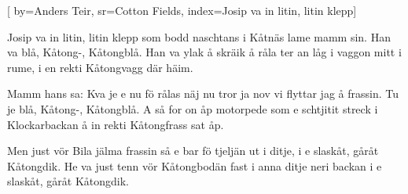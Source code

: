 

[ 		%
	by={Anders Teir},					%
	sr={Cotton Fields},					%
	index={Josip va in litin, litin klepp}]						%
	

\beginverse*						%
Josip va in litin, litin klepp som bodd
naschtans i Kåtnäs lame mamm sin.
Han va blå, Kåtong-, Kåtongblå.
Han va ylak å skräik å råla ter an låg
i vaggon mitt i rume,
i en rekti Kåtongvagg där häim.
\endverse							%

\beginverse*						%
Mamm hans sa: Kva je e nu fö rålas
näj nu tror ja nov vi flyttar jag å frassin.
Tu je blå, Kåtong-, Kåtongblå.
A så for on åp motorpede som e schtjitit
streck i Klockarbackan
å in rekti Kåtongfrass sat åp.
\endverse							%

\beginverse*						%
Men just vör Bila jälma frassin
så e bar fö tjeljän ut i ditje,
i e slaskåt, gåråt Kåtongdik.
He va just tenn vör Kåtongbodän
fast i anna ditje neri backan
i e slaskåt, gåråt Kåtongdik.
\endverse							%
\endsong							%

